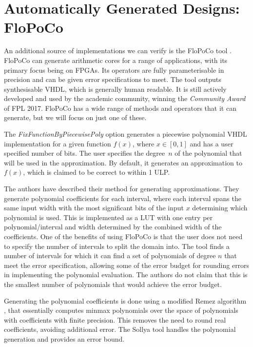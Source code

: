 \documentclass{fac}
\begin{document}
\section{Automatically Generated Designs: FloPoCo}
\label{flopoco}
An additional source of implementations we can verify is the FloPoCo tool \cite{DinechinPasca2011-DaT}. FloPoCo can generate arithmetic cores for a range of applications, with its primary focus being on FPGAs. Its operators are fully parameterisable in precision and can be given error specifications to meet. The tool outputs synthesisable VHDL, which is generally human readable. It is still actively developed and used by the academic community, winning the \textit{Community Award} of FPL 2017. FloPoCo has a wide range of methods and operators that it can generate, but we will focus on just one of these.

The \textit{FixFunctionByPiecewisePoly} option generates a piecewise polynomial VHDL implementation for a given function $f(x)$, where $x\in [0,1]$ and has a user specified number of bits. The user specifies the degree~$n$ of the polynomial that will be used in the approximation. By default, it generates an approximation to $f(x)$, which is claimed to be correct to within 1 ULP. 

The authors \cite{DinJolPas2010-poly} have described their method for generating approximations.
They generate polynomial coefficients for each interval, where each interval spans the same input width with the most significant bits of the input $x$ determining which polynomial is used. This is implemented as a LUT with one entry per polynomial/interval and width determined by the combined width of the coefficients. One of the benefits of using FloPoCo is that the user does not need to specify the number of intervals to split the domain into. The tool finds a number of intervals for which it can find a set of polynomials of degree $n$ that meet the error specification, allowing some of the error budget for rounding errors in implementing the polynomial evaluation. The authors do not claim that this is the smallest number of polynomials that would achieve the error budget. 

Generating the polynomial coefficients is done using a modified Remez algorithm \cite{brisebarre2007efficient}, that essentially computes minmax polynomials over the space of polynomials with coefficients with finite precision. This removes the need to round real coefficients, avoiding additional error. The Sollya tool \cite{ChevillardJoldesLauter2010} handles the polynomial generation and provides an error bound. 
\end{document}
